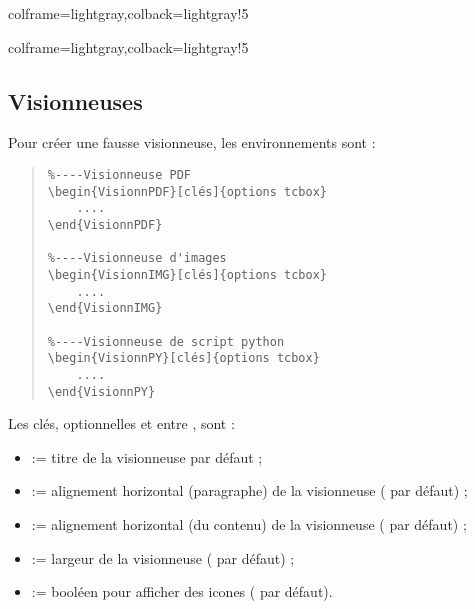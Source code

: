 \documentclass[11pt,a4paper]{ltxdoc}
\begin{document}
\begin{tcblisting}{colframe=lightgray,colback=lightgray!5}
\end{tcblisting}

\begin{tcblisting}{colframe=lightgray,colback=lightgray!5}
\end{tcblisting}

\pagebreak

\subsection{Visionneuses}

Pour créer une \og fausse\fg{} visionneuse, les environnements sont :

\begin{quote}
\begin{verbatim}
%----Visionneuse PDF
\begin{VisionnPDF}[clés]{options tcbox}
    ....
\end{VisionnPDF}

%----Visionneuse d'images
\begin{VisionnIMG}[clés]{options tcbox}
    ....
\end{VisionnIMG}

%----Visionneuse de script python
\begin{VisionnPY}[clés]{options tcbox}
    ....
\end{VisionnPY}
\end{verbatim}
\end{quote}

Les \textsf{clés}, optionnelles et entre \MontreCode{[...]}, sont :

\begin{itemize}
	\item {} := titre de la visionneuse par défaut ;
	\item {} := alignement horizontal (paragraphe) de la visionneuse ( par défaut) ;
	\item {} := alignement horizontal (du contenu) de la visionneuse ( par défaut) ;
	\item {} := largeur de la visionneuse ( par défaut) ;
	\item {} := booléen pour afficher des icones ( par défaut).
\end{itemize}
\end{document}
